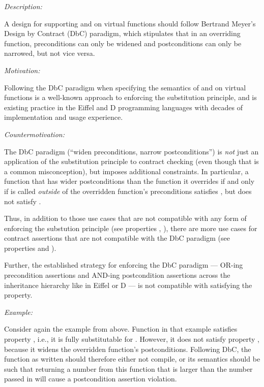 
\emph{Description:}

A design for supporting  and  on virtual functions should follow Bertrand Meyer's Design by Contract (DbC) paradigm, which stipulates that in an overriding function, preconditions can only be widened and postconditions can only be narrowed, but not vice versa.

\emph{Motivation:}

Following the DbC paradigm when  specifying the semantics of  and  on virtual functions is a well-known approach to enforcing the substitution principle, and is existing practice in the Eiffel and D programming languages with decades of implementation and usage experience.

\emph{Countermotivation:} 

The DbC paradigm (``widen preconditions, narrow postconditions'') is \emph{not} just an application of the substitution principle to contract checking (even though that is a common misconception), but imposes additional constraints. In particular, a function that has wider postconditions than the function it overrides if and only if is called \emph{outside} of the overridden function's preconditions satisfies , but does not satisfy . 

Thus,  in addition to those use cases that are not compatible with any form of enforcing the substution principle (see properties , ), there are more use cases for contract assertions that are not compatible with the DbC paradigm (see properties   and ).

Further, the established strategy for enforcing the DbC paradigm --- OR-ing precondition assertions and AND-ing postcondition assertions across the inheritance hierarchy like in Eiffel or D --- is not compatible with satisfying the  property.


\emph{Example:}

Consider again the example from  above. Function  in that example satisfies property , i.e., it is fully substitutable for . However, it does not satisfy property , because it widens the overridden function's postconditions. Following DbC, the function  as written should therefore either not compile, or its semantics should be such that returning a number from this function that is larger than the number passed in will cause a postcondition assertion violation.


